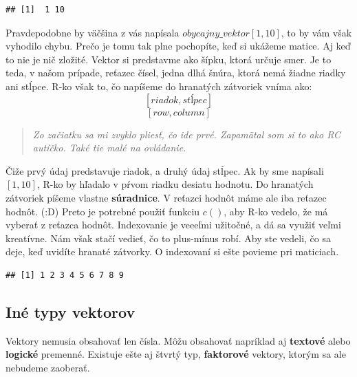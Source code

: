 \begin{verbatim}
## [1]  1 10
\end{verbatim}

Pravdepodobne by väčšina z vás napísala \(obycajny\_vektor[1, 10]\), to
by vám však vyhodilo chybu. Prečo je tomu tak plne pochopíte, keď si
ukážeme matice. Aj keď to nie je nič zložité. Vektor si predstavme ako
šípku, ktorá určuje smer. Je to teda, v našom prípade, reťazec čísel,
jedna dlhá šnúra, ktorá nemá žiadne riadky ani stĺpce. R-ko však to, čo
napíšeme do hranatých zátvoriek vníma ako:
\[[riadok, stĺpec]\]
\[[row, column]\]

\begin{quote}
\emph{Zo začiatku sa mi zvyklo pliesť, čo ide prvé. Zapamätal som si to
ako RC autíčko. Také tie malé na ovládanie.}
\end{quote}

Čiže prvý údaj predstavuje riadok, a druhý údaj stĺpec. Ak by sme
napísali \([1, 10]\), R-ko by hľadalo v pŕvom riadku desiatu hodnotu. Do
hranatých zátvoriek píšeme vlastne \textbf{súradnice}. V reťazci hodnôt
máme ale iba reťazec hodnôt. (:D) Preto je potrebné použiť funkciu
\(c()\), aby R-ko vedelo, že má vyberať z reťazca hodnôt. Indexovanie je
veeeľmi užitočné, a dá sa využiť veľmi kreatívne. Nám však stačí vedieť,
čo to plus-mínus robí. Aby ste vedeli, čo sa deje, keď uvidíte hranaté
zátvorky. O indexovaní si ešte povieme pri maticiach.

\begin{Shaded}
\begin{Highlighting}[]
\NormalTok{obycajny_vektor[}\OperatorTok{-}\NormalTok{]}
\end{Highlighting}
\end{Shaded}

\begin{verbatim}
## [1] 1 2 3 4 5 6 7 8 9
\end{verbatim}

\hypertarget{inuxe9-typy-vektorov}{%
\subsection{Iné typy vektorov}\label{inuxe9-typy-vektorov}}

Vektory nemusia obsahovať len čísla. Môžu obsahovať napríklad aj
\textbf{textové} alebo \textbf{logické} premenné. Existuje ešte aj
štvrtý typ, \textbf{faktorové} vektory, ktorým sa ale nebudeme zaoberať.

